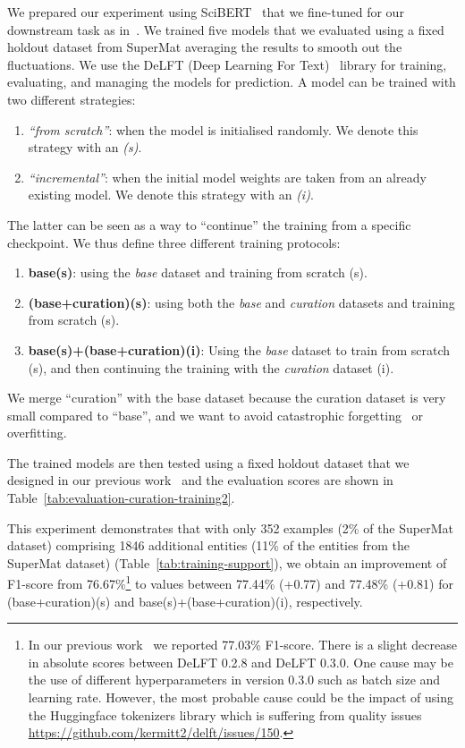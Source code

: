 \documentclass[]{interact}
\theoremstyle{plain} %
\theoremstyle{definition}
\theoremstyle{remark}
\begin{document}
We prepared our experiment using SciBERT~\cite{Beltagy2019SciBERT} that we fine-tuned for our downstream task as in~\cite{lfoppiano2023automatic}. 
We trained five models that we evaluated using a fixed holdout dataset from SuperMat averaging the results to smooth out the fluctuations. 
We use the DeLFT (Deep Learning For Text)~\cite{DeLFT} library for training, evaluating, and managing the models for prediction.  
A model can be trained with two different strategies: 
\begin{enumerate}
    \item \emph{``from scratch''}: when the model is initialised randomly. We denote this strategy with an \emph{(s)}.
    \item \emph{``incremental''}: when the initial model weights are taken from an already existing model. We denote this strategy with an \emph{(i)}.
\end{enumerate}
The latter can be seen as a way to ``continue'' the training from a specific checkpoint.
We thus define three different training protocols: 
\begin{enumerate}
    \item \textbf{base(s)}: using the \emph{base} dataset and training from scratch (s).
    \item \textbf{(base+curation)(s)}: using both the \emph{base} and \emph{curation} datasets and training from scratch (s).
    \item \textbf{base(s)+(base+curation)(i)}: Using the \emph{base} dataset to train from scratch (s), and then continuing the training with the \emph{curation} dataset (i).
\end{enumerate}
We merge ``curation'' with the base dataset because the curation dataset is very small compared to ``base'', and we want to avoid catastrophic forgetting~\cite{overcoming-kirkpatrick-etal-2016} or overfitting.

The trained models are then tested using a fixed holdout dataset that we designed in our previous work~\cite{lfoppiano2023automatic} and the evaluation scores are shown in Table~\ref{tab:evaluation-curation-training2}.

This experiment demonstrates that with only 352 examples (2\% of the SuperMat dataset) comprising 1846 additional entities (11\% of the entities from the SuperMat dataset) (Table~\ref{tab:training-support}), we obtain an improvement of F1-score from 76.67\%\footnote{In our previous work~\cite{lfoppiano2023automatic} we reported 77.03\% F1-score. 
There is a slight decrease in absolute scores between DeLFT 0.2.8 and DeLFT 0.3.0. 
One cause may be the use of different hyperparameters in version 0.3.0 such as batch size and learning rate.
However, the most probable cause could be the impact of using the Huggingface tokenizers library which is suffering from quality issues \url{https://github.com/kermitt2/delft/issues/150}.} to values between 77.44\% (+0.77) and 77.48\% (+0.81) for (base+curation)(s) and base(s)+(base+curation)(i), respectively. 
\end{document}
